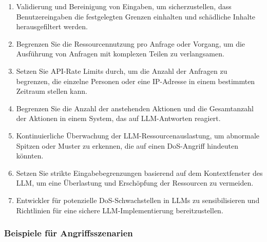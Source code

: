 \documentclass[
]{article}
\providecommand{\tightlist}{%
  \setlength{\itemsep}{0pt}\setlength{\parskip}{0pt}}
\begin{document}
\begin{enumerate}
\def\labelenumi{\arabic{enumi}.}
\tightlist
\item
  Validierung und Bereinigung von Eingaben, um sicherzustellen, dass
  Benutzereingaben die festgelegten Grenzen einhalten und schädliche
  Inhalte herausgefiltert werden.
\item
  Begrenzen Sie die Ressourcennutzung pro Anfrage oder Vorgang, um die
  Ausführung von Anfragen mit komplexen Teilen zu verlangsamen.
\item
  Setzen Sie API-Rate Limits durch, um die Anzahl der Anfragen zu
  begrenzen, die einzelne Personen oder eine IP-Adresse in einem
  bestimmten Zeitraum stellen kann.
\item
  Begrenzen Sie die Anzahl der anstehenden Aktionen und die Gesamtanzahl
  der Aktionen in einem System, das auf LLM-Antworten reagiert.
\item
  Kontinuierliche Überwachung der LLM-Ressourcenauslastung, um abnormale
  Spitzen oder Muster zu erkennen, die auf einen DoS-Angriff hindeuten
  könnten.
\item
  Setzen Sie strikte Eingabebegrenzungen basierend auf dem
  Kontextfenster des LLM, um eine Überlastung und Erschöpfung der
  Ressourcen zu vermeiden.
\item
  Entwickler für potenzielle DoS-Schwachstellen in LLMs zu
  sensibilisieren und Richtlinien für eine sichere LLM-Implementierung
  bereitzustellen.
\end{enumerate}

\subsubsection{Beispiele für
Angriffsszenarien}\label{beispiele-fuxfcr-angriffsszenarien}
\end{document}
